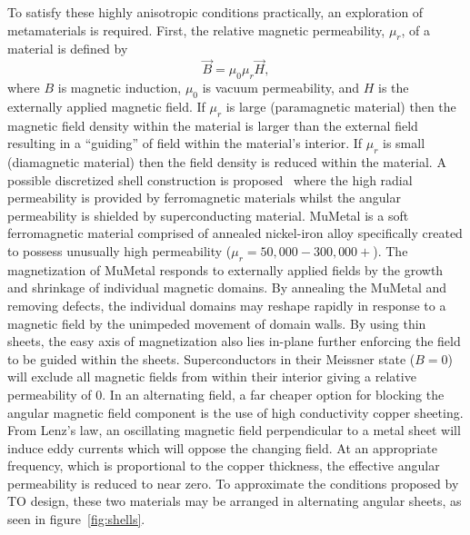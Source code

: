 \documentclass[11pt]{iopart}
\begin{document}
To satisfy these highly anisotropic conditions practically, an
exploration of metamaterials is required. First, the relative magnetic
permeability, $\mu_r$, of a material is defined by
\begin{equation}
  \vec{B} = \mu_0\mu_r \vec{H},
\end{equation}
where $B$ is magnetic induction, $\mu_0$ is vacuum permeability, and
$H$ is the externally applied magnetic field. If $\mu_r$ is large
(paramagnetic material) then the magnetic field density within the
material is larger than the external field resulting in a ``guiding''
of field within the material's interior. If $\mu_r$ is small
(diamagnetic material) then the field density is reduced within the material.
A possible discretized shell construction
is proposed~\cite{N2014} where the high radial permeability is
provided by ferromagnetic materials whilst the angular permeability is
shielded by superconducting material.
MuMetal is a soft ferromagnetic material comprised of annealed
nickel-iron alloy specifically created to possess unusually high
permeability ($\mu_r = 50,000-300,000+$).  The magnetization of
MuMetal responds to externally applied fields by the growth and
shrinkage of individual magnetic domains. By annealing the MuMetal and
removing defects, the individual domains may reshape rapidly in
response to a magnetic field by the unimpeded movement of domain
walls.
By using thin sheets, the
easy axis of magnetization also lies in-plane further enforcing the
field to be guided within the sheets. Superconductors in their
Meissner state ($B = 0$) will exclude all magnetic fields from within
their interior giving a relative permeability of $0$. In an
alternating field, a far cheaper option for blocking the angular
magnetic field component is the use of high conductivity copper
sheeting. From Lenz's law, an oscillating magnetic field perpendicular
to a metal sheet will induce eddy currents which will oppose the
changing field. At an appropriate frequency, which is
proportional to the copper thickness, the effective angular
permeability is reduced to near zero. To approximate the conditions
proposed by TO design, these two materials may be arranged in
alternating angular sheets, as seen in figure~\ref{fig:shells}.
\end{document}
